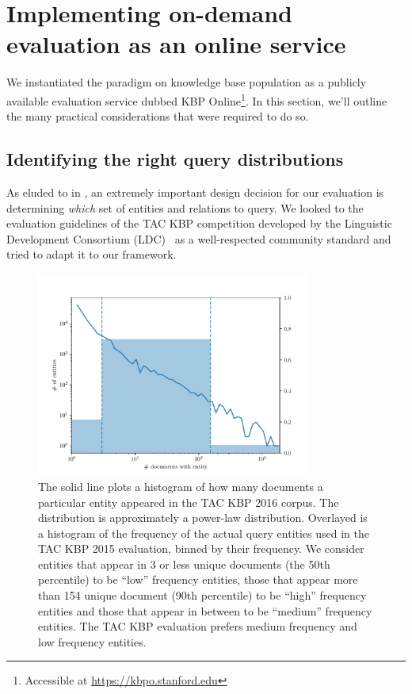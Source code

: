 \section{\label{sec:kbpo:kbpo} Implementing on-demand evaluation as an online service}
We instantiated the paradigm on knowledge base population as a publicly available evaluation service dubbed KBP Online\footnote{Accessible at \url{https://kbpo.stanford.edu}}.
In this section, we'll outline the many practical considerations that were required to do so.

\subsection{Identifying the right query distributions}
As eluded to in , an extremely important design decision for our evaluation is determining \textit{which} set of entities and relations to query.
We looked to the evaluation guidelines of the TAC KBP competition developed by the Linguistic Development Consortium (LDC)~\citep{ellis2015tackbp,mayfield2012evaluating} as a well-respected community standard and tried to adapt it to our framework.

\begin{figure}
  \centering
  \includegraphics[width=0.8\textwidth]{figures/analysis/distribution}
  \caption[TAC KBP 2015 Query entity distribution]{\label{fig:kbpo:distribution}
    The solid line plots a histogram of how many documents a particular entity appeared in the TAC KBP 2016 corpus.
    The distribution is approximately a power-law distribution.
    Overlayed is a histogram of the frequency of the actual query entities used in the TAC KBP 2015 evaluation, binned by their frequency. We consider entities that appear in 3 or less unique documents (the 50th percentile) to be ``low'' frequency entities, those that appear more than 154 unique document (90th percentile) to be ``high'' frequency entities and those that appear in between to be ``medium'' frequency entities.
    The TAC KBP evaluation prefers medium frequency and low frequency entities.
  }
\end{figure}

